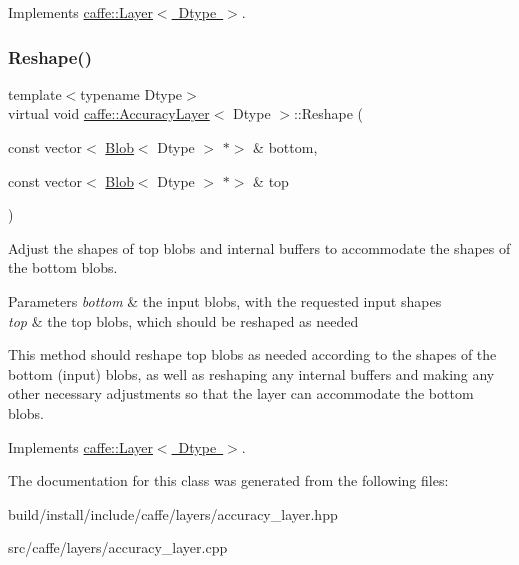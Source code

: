 Implements \mbox{\hyperlink{classcaffe_1_1_layer_a7fe981e8af8d93d587acf2a952be563d}{caffe\+::\+Layer$<$ Dtype $>$}}.

\mbox{\label{classcaffe_1_1_accuracy_layer_a1a42bc91c233a9f803482bff30163f36}} 
\subsubsection{\texorpdfstring{Reshape()}{Reshape()}\hspace{0.1cm}{\footnotesize\ttfamily [2/2]}}
{\footnotesize\ttfamily template$<$typename Dtype$>$ \\
virtual void \mbox{\hyperlink{classcaffe_1_1_accuracy_layer}{caffe\+::\+Accuracy\+Layer}}$<$ Dtype $>$\+::Reshape (\begin{DoxyParamCaption}\item[{const vector$<$ \mbox{\hyperlink{classcaffe_1_1_blob}{Blob}}$<$ Dtype $>$ $\ast$$>$ \&}]{bottom,  }\item[{const vector$<$ \mbox{\hyperlink{classcaffe_1_1_blob}{Blob}}$<$ Dtype $>$ $\ast$$>$ \&}]{top }\end{DoxyParamCaption})\hspace{0.3cm}{\ttfamily [virtual]}}



Adjust the shapes of top blobs and internal buffers to accommodate the shapes of the bottom blobs. 


\begin{DoxyParams}{Parameters}
{\em bottom} & the input blobs, with the requested input shapes \\
\hline
{\em top} & the top blobs, which should be reshaped as needed\\
\hline
\end{DoxyParams}
This method should reshape top blobs as needed according to the shapes of the bottom (input) blobs, as well as reshaping any internal buffers and making any other necessary adjustments so that the layer can accommodate the bottom blobs. 

Implements \mbox{\hyperlink{classcaffe_1_1_layer_a7fe981e8af8d93d587acf2a952be563d}{caffe\+::\+Layer$<$ Dtype $>$}}.



The documentation for this class was generated from the following files\+:\begin{DoxyCompactItemize}
\item 
build/install/include/caffe/layers/accuracy\+\_\+layer.\+hpp\item 
src/caffe/layers/accuracy\+\_\+layer.\+cpp\end{DoxyCompactItemize}
